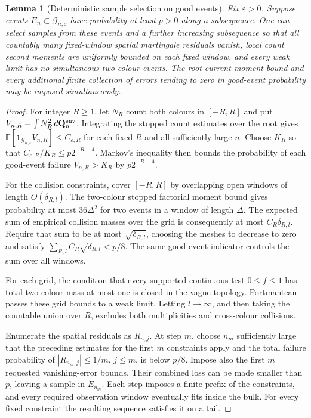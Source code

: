 \documentclass[11pt,reqno]{amsart}
\newtheorem{lemma}[theorem]{Lemma}
\theoremstyle{definition}
\theoremstyle{remark}
\numberwithin{equation}{section}
\newcommand{\E}{\mathbb E}
\begin{document}
\begin{lemma}[Deterministic sample selection on good events]
\label{lem:good-sample-extraction}
Fix \(\varepsilon>0\).  Suppose events
\(E_n\subset\mathcal G_{n,\varepsilon}\) have probability at least
\(p>0\) along a subsequence.  One can select samples from these
events and a further increasing subsequence so that all countably many
fixed-window spatial martingale residuals vanish, local count second
moments are uniformly bounded on each fixed window, and every weak
limit has no simultaneous two-colour events.  The root-current
moment bound and every additional finite collection of errors tending
to zero in good-event probability may be imposed simultaneously.
\end{lemma}

\begin{proof}
For integer \(R\ge1\), let \(N_R\) count both colours in \([-R,R]\)
and put \(V_{n,R}=\int N_R^2\,d\mathbf Q_n^{\rm env}\).
Integrating the stopped count estimates over the root gives
\(\E[\mathbf1_{\mathcal G_{n,\varepsilon}}V_{n,R}]
\le C_{\varepsilon,R}\) for each fixed \(R\) and all sufficiently
large \(n\).  Choose \(K_R\) so that
\(C_{\varepsilon,R}/K_R\le p2^{-R-4}\).
Markov's inequality then bounds the probability of each good-event
failure \(V_{n,R}>K_R\) by \(p2^{-R-4}\).

For the collision constraints, cover \([-R,R]\) by overlapping open
windows of length \(O(\delta_{R,l})\).  The two-colour stopped factorial
moment bound gives probability at most \(36\Delta^2\) for two events
in a window of length \(\Delta\).  The expected sum of empirical
collision masses over the grid is consequently at most
\(C_R\delta_{R,l}\).  Require that sum to be at most
\(\sqrt{\delta_{R,l}}\), choosing the meshes to decrease to zero and
satisfy \(\sum_{R,l}C_R\sqrt{\delta_{R,l}}<p/8\).
The same good-event indicator controls the sum over all windows.

For each grid, the condition that every supported continuous test
\(0\le f\le1\) has total two-colour mass at most one is closed in
the vague topology.  Portmanteau passes these grid bounds to a weak
limit.  Letting \(l\to\infty\), and then taking the countable union
over \(R\), excludes both multiplicities and cross-colour collisions.

Enumerate the spatial residuals as \(R_{n,j}\).  At step \(m\), choose
\(n_m\) sufficiently large that the preceding estimates for the
first \(m\) constraints apply and the total failure probability of
\(|R_{n_m,j}|\le1/m\), \(j\le m\), is below \(p/8\).
Impose also the first \(m\) requested vanishing-error bounds.
Their combined loss can be made smaller than \(p\), leaving a sample
in \(E_{n_m}\).  Each step imposes a finite prefix of the constraints,
and every required observation window eventually fits inside the bulk.
For every fixed constraint the resulting sequence satisfies it on a tail.


\end{proof}
\end{document}
